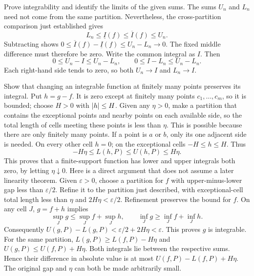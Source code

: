 \goal Prove integrability and identify the limits of the given sums.
The sums $U_n$ and $L_n$ need not come from the same partition.
Nevertheless, the cross-partition comparison just established gives
\[
 L_n\le\underline I(f)\le\overline I(f)\le U_n.
\]
Subtracting shows
$0\le\overline I(f)-\underline I(f)\le U_n-L_n\to0$.
The fixed middle difference must therefore be zero. Write the common
integral as $I$. Then
\[
 0\le U_n-I\le U_n-L_n,\qquad
 0\le I-L_n\le U_n-L_n.
\]
Each right-hand side tends to zero, so both $U_n\to I$ and $L_n\to I$.

\goal Show that changing an integrable function at finitely many points
preserves its integral.
Put $h=g-f$. It is zero except at finitely many points
$c_1,\ldots,c_m$, so it is bounded; choose $H>0$ with $\left|h\right|\le H$.
Given any $\eta>0$, make a partition that contains the exceptional points
and nearby points on each available side, so the total length of cells
meeting these points is less than $\eta$. This is possible because there
are only finitely many points. If a point is $a$ or $b$, only its one
adjacent side is needed. On every other cell $h=0$; on the exceptional
cells $-H\le h\le H$. Thus
\[
 -H\eta\le L(h,P)\le U(h,P)\le H\eta.
\]
This proves that a finite-support function has lower and upper integrals
both zero, by letting $\eta\downarrow0$.
Here is a direct argument that does not assume a later linearity theorem.
Given $\varepsilon>0$, choose a partition for $f$ with upper-minus-lower
gap less than $\varepsilon/2$. Refine it to the partition just described,
with exceptional-cell total length less than $\eta$ and
$2H\eta<\varepsilon/2$. Refinement preserves the bound for $f$.
On any cell $J$, $g=f+h$ implies
\[
 \sup_J g\le\sup_J f+\sup_J h,\qquad
 \inf_J g\ge\inf_J f+\inf_J h.
\]
Consequently $U(g,P)-L(g,P)<\varepsilon/2+2H\eta<\varepsilon$.
This proves $g$ is integrable.
For the same partition,
$L(g,P)\ge L(f,P)-H\eta$ and $U(g,P)\le U(f,P)+H\eta$.
Both integrals lie between the respective sums. Hence their difference
in absolute value is at most
$U(f,P)-L(f,P)+H\eta$.
The original gap and $\eta$ can both be made arbitrarily small.

